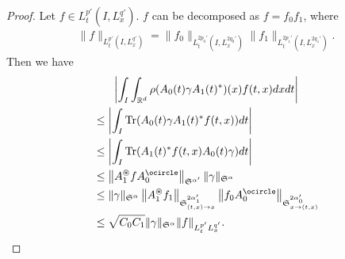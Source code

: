 \documentclass[AHL,Unicode,longabstracts,MathTools,published]{cedram}
\newcommand{\oast}{\circledast}
\newcommand{\FS}{\mathfrak{S}}
\newcommand{\al}{\alpha}
\newcommand{\ga}{\gamma}
\newcommand{\rh}{\rho}
\newcommand{\abs}[1]{\left|#1\right|}
\renewcommand{\No}[1]{\left\| #1 \right\|}
\DeclareMathOperator{\Tr}{Tr}
\newcommand{\Sa}{{\FS^\al}}
\newcommand{\R}{\mathbb{R}}
\newcommand{\oc}{\ocircle}
\newcommand{\os}{\oast}
\begin{document}
\begin{proof}
Let $f \in L^{p'}_t(I,L^{q'}_x)$. $f$ can be decomposed as $f = f_0 f_1$, where
\begin{align}
\|f\|_{L^{p'}_t\left(I,L^{q'}_x\right)} = \|f_0\|_{L^{2p_0'}_t\left(I,L^{2q_0'}_x\right)} \|f_1\|_{L^{2p_1'}_t\left(I,L^{2q_1'}_x\right)}.
\end{align}
Then we have
\begin{multline}
\abs{\int_I \int_{\R^d} \rh(A_0(t)\ga A_1(t)^*)(x) f(t,x) dx dt}\\
\begin{aligned}
 &\leq \abs{\int_I \Tr (A_0(t) \ga A_1(t)^* f(t,x)) dt } \\
&\leq \abs{\int_I \Tr (A_1(t)^* f(t,x)A_0(t) \ga) dt} \\
&\leq \No{A_1^\os f A_0^\oc }_{\FS^{\al'}} \|\ga\|_{\FS^\al} \\
&\leq \|\ga\|_{\Sa} \left\|A_1^\os f_1\right\|_{\FS^{2\al_1'}_{(t,x) \to x}} \left\|f_0 A_0^\oc\right\|_{\FS^{2\al_0'}_{x\to(t,x)}}\\
&\leq \sqrt{C_0C_1}\|\ga\|_\Sa \|f\|_{L^{p'}_tL^{q'}_x}.\qedhere
\end{aligned}
\end{multline}
\end{proof}
\end{document}
